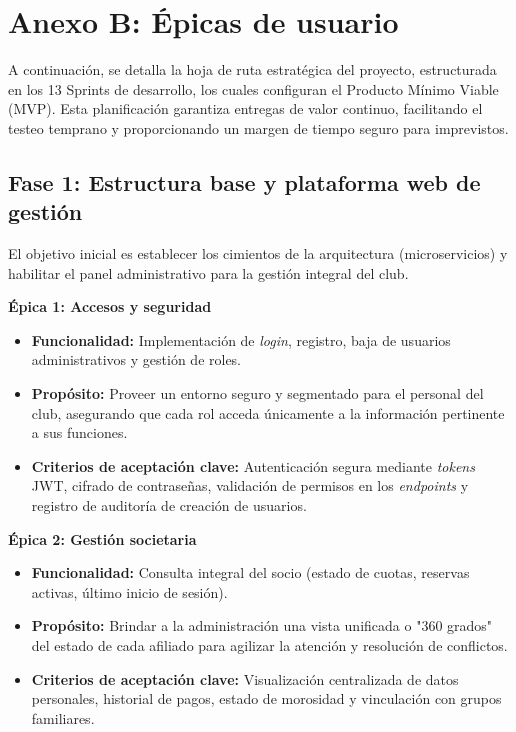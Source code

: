 \section{Anexo B: Épicas de usuario}

A continuación, se detalla la hoja de ruta estratégica del proyecto, estructurada en los 13 Sprints de desarrollo, los cuales configuran el Producto Mínimo Viable (MVP). Esta planificación garantiza entregas de valor continuo, facilitando el testeo temprano y proporcionando un margen de tiempo seguro para imprevistos.

\subsection{Fase 1: Estructura base y plataforma web de gestión}

El objetivo inicial es establecer los cimientos de la arquitectura (microservicios) y habilitar el panel administrativo para la gestión integral del club.

\textbf{Épica 1: Accesos y seguridad}
\begin{itemize}
    \item \textbf{Funcionalidad:} Implementación de \textit{login}, registro, baja de usuarios administrativos y gestión de roles.
    \item \textbf{Propósito:} Proveer un entorno seguro y segmentado para el personal del club, asegurando que cada rol acceda únicamente a la información pertinente a sus funciones.
    \item \textbf{Criterios de aceptación clave:} Autenticación segura mediante \textit{tokens} JWT, cifrado de contraseñas, validación de permisos en los \textit{endpoints} y registro de auditoría de creación de usuarios.
\end{itemize}

\textbf{Épica 2: Gestión societaria}
\begin{itemize}
    \item \textbf{Funcionalidad:} Consulta integral del socio (estado de cuotas, reservas activas, último inicio de sesión).
    \item \textbf{Propósito:} Brindar a la administración una vista unificada o "360 grados" del estado de cada afiliado para agilizar la atención y resolución de conflictos.
    \item \textbf{Criterios de aceptación clave:} Visualización centralizada de datos personales, historial de pagos, estado de morosidad y vinculación con grupos familiares.
\end{itemize}

